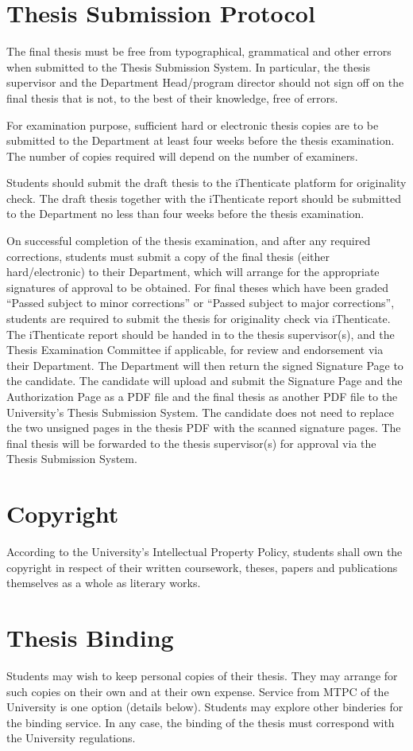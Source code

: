 \section{Thesis Submission Protocol}

The final thesis must be free from typographical, grammatical and other errors when submitted to the Thesis Submission System. In particular, the thesis supervisor and the Department Head/program director should not sign off on the final thesis that is not, to the best of their knowledge, free of errors.

For examination purpose, sufficient hard or electronic thesis copies are to be submitted to the Department at least four weeks before the thesis examination. The number of copies required will depend on the number of examiners.

Students should submit the draft thesis to the iThenticate platform for originality check. The draft thesis together with the iThenticate report should be submitted to the Department no less than four weeks before the thesis examination.

On successful completion of the thesis examination, and after any required corrections, students must submit a copy of the final thesis (either hard/electronic) to their Department, which will arrange for the appropriate signatures of approval to be obtained.
For final theses which have been graded ``Passed subject to minor corrections'' or ``Passed subject to major corrections'', students are required to submit the thesis for originality check via iThenticate. The iThenticate report should be handed in to the thesis supervisor(s), and the Thesis Examination Committee if applicable, for review and endorsement via their Department.
The Department will then return the signed Signature Page to the candidate.
The candidate will upload and submit the Signature Page and the Authorization Page as a PDF file and the final thesis as another PDF file to the University's Thesis Submission System. The candidate does not need to replace the two unsigned pages in the thesis PDF with the scanned signature pages. The final thesis will be forwarded to the thesis supervisor(s) for approval via the Thesis Submission System.

\section{Copyright}

According to the University's Intellectual Property Policy, students shall own the copyright in respect of their written coursework, theses, papers and publications themselves as a whole as literary works.

\section{Thesis Binding}

Students may wish to keep personal copies of their thesis. They may arrange for such copies on their own and at their own expense. Service from MTPC of the University is one option (details below). Students may explore other binderies for the binding service. In any case, the binding of the thesis must correspond with the University regulations.
